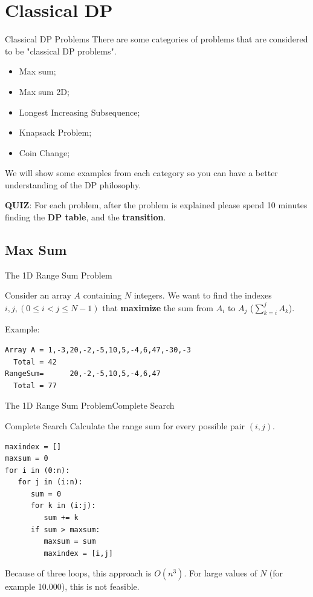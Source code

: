 \section{Classical DP}
\begin{frame}{Classical DP Problems}
  There are some categories of problems that are considered to be "classical DP problems".
  \bigskip

  \begin{itemize}
    \item Max sum;
    \item Max sum 2D;
    \item Longest Increasing Subsequence;
    \item Knapsack Problem;
    \item Coin Change;
  \end{itemize}
  \bigskip

  We will show some examples from each category so you can have a better understanding of the DP philosophy.\bigskip

  {\bf QUIZ}: For each problem, after the problem is explained please spend 10 minutes finding the {\bf DP table}, and the {\bf transition}.
\end{frame}

\subsection{Max Sum}

\begin{frame}[fragile]{The 1D Range Sum Problem}

  Consider an array $A$ containing $N$ integers. We want to find the indexes $i,j, (0 \leq i < j \leq N-1)$ that {\bf maximize} the sum from $A_i$ to $A_j$ ($\sum_{k=i}^{j} A_k$).
  \bigskip

  Example:
\begin{verbatim}
Array A = 1,-3,20,-2,-5,10,5,-4,6,47,-30,-3
  Total = 42
RangeSum=      20,-2,-5,10,5,-4,6,47
  Total = 77
\end{verbatim}
\end{frame}

\begin{frame}[fragile]{The 1D Range Sum Problem}{Complete Search}
  \begin{block}{Complete Search}
    Calculate the range sum for every possible pair $(i,j)$.

{\smaller
\begin{verbatim}
maxindex = []
maxsum = 0
for i in (0:n):
   for j in (i:n):
      sum = 0
      for k in (i:j):
         sum += k
      if sum > maxsum:
         maxsum = sum
         maxindex = [i,j]
\end{verbatim}
}
  \end{block}

  Because of three loops, this approach is $O(n^3)$. For large values of $N$ (for example 10.000), this is not feasible.
\end{frame}

